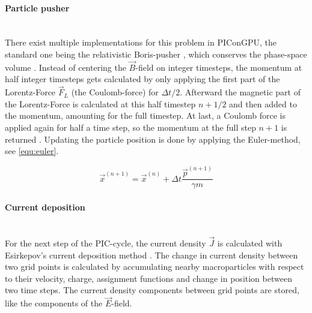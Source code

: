 \documentclass[bachelor_thesis]{subfiles}
\begin{document}
\paragraph*{Particle pusher}\hspace{0pt} \\
There exist multiple implementations for this problem in PIConGPU, the standard one being the relativistic Boris-pusher \cite{Boris1970}, which conserves the phase-space volume \cite{PICRepo}. Instead of centering the $\vec{B}$-field on integer timesteps, the momentum at half integer timesteps gets
calculated by only applying the first part of the Lorentz-Force $\vec{F}_L$ (the Coulomb-force) for $\Delta t/2$. Afterward the magnetic part of the Lorentz-Force is calculated at this half timestep $n+1/2$ and then added to the momentum, amounting for the full timestep.
At last, a Coulomb force is applied again for half a time step, so the momentum at the full step $n+1$ is returned \cite{Zenitani2018, Pausch2019}. Updating the particle position is done by applying the Euler-method, see \autoref{equ:euler}.

\begin{equation}
	\vec{x}^{(n+1)} = \vec{x}^{(n)} + \Delta t \frac{\vec{p}^{(n+1)}}{\gamma m}
	\label{equ:euler}
\end{equation}

\paragraph*{Current deposition}\hspace{0pt} \\
For the next step of the PIC-cycle, the current density $\vec{J}$ is calculated with Esirkepov’s current deposition method \cite{Esirkepov2001}.
The change in current density between two grid points is calculated by accumulating nearby macroparticles with respect to their velocity, charge, assignment functions and change in position between two time steps. 
The current density components between grid points are stored, like the components of the $\vec{E}$-field.
\end{document}
